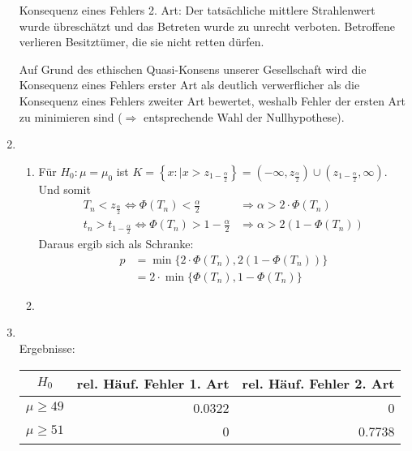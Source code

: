 \documentclass[a4paper]{scrartcl}
\def \blattnr {9}
\begin{document}
\begin{enumerate}[label=\bfseries \blattnr.\arabic*]
      Konsequenz eines Fehlers 2. Art: Der tatsächliche mittlere Strahlenwert wurde übreschätzt und das Betreten wurde zu unrecht 
      verboten. Betroffene verlieren Besitztümer, die sie nicht retten dürfen. 
      
      Auf Grund des ethischen Quasi-Konsens unserer Gesellschaft wird die Konsequenz eines Fehlers erster Art als deutlich verwerflicher 
      als die Konsequenz eines Fehlers zweiter Art bewertet, weshalb Fehler der ersten Art zu minimieren sind ($\Rightarrow$ entsprechende 
      Wahl der Nullhypothese).
    
    \item 
      \begin{enumerate}
       \item Für $H_0: \mu = \mu_0$ ist 
       $K = \left\{x:|x>z_{1-\frac\alpha 2} \right\} = \left(-\infty, z_{\frac\alpha 2}\right) \cup \left(z_{1-\frac\alpha 2}, \infty \right)$. Und somit
	\begin{equation*}
	  \begin{split}
	    T_n<z_{\frac\alpha 2} \Leftrightarrow \Phi(T_n)<\frac\alpha 2 &\Rightarrow \alpha > 2\cdot \Phi(T_n) \\
	    t_n>t_{1-\frac\alpha 2} \Leftrightarrow \Phi(T_n) > 1-\frac\alpha 2 &\Rightarrow \alpha > 2(1-\Phi(T_n))
	  \end{split}
	\end{equation*}
      Daraus ergib sich als Schranke: 
      \begin{equation*}
	  \begin{split}
	    p 
	    &= \min\{2\cdot \Phi(T_n), 2(1-\Phi(T_n))\}  \\
	    &= 2 \cdot \min\{\Phi(T_n), 1-\Phi(T_n)\}
	  \end{split}
	\end{equation*}
       
       \item 
      \end{enumerate}

    \pagebreak
    \item \hfill \\ 
      
      
      \pagebreak
      Ergebnisse:
      
      \begin{tabular}{c|r|r}
       $H_0$ & rel. Häuf. Fehler 1. Art & rel. Häuf. Fehler 2. Art \\
       \hline
       $\mu \geq 49$ & 0.0322 & 0 \\
       $\mu \geq 51$ & 0 & 0.7738
      \end{tabular}
      

\end{enumerate}
\end{document}
